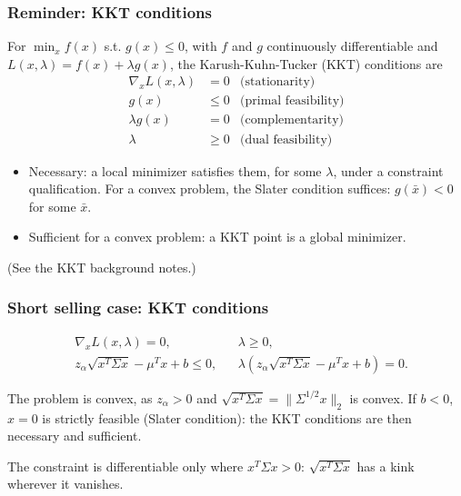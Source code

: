 \documentclass[aspectratio=169]{beamer}
\begin{document}
\begin{frame}
\frametitle{Reminder: KKT conditions}

For $\min_x f(x)$ s.t. $g(x) \leq 0$, with $f$ and $g$ continuously differentiable and $L(x,\lambda) = f(x) + \lambda g(x)$, the Karush-Kuhn-Tucker (KKT) conditions are
\begin{align*}
\nabla_x L(x,\lambda) &= 0 & \text{(stationarity)} \\
g(x) &\leq 0 & \text{(primal feasibility)} \\
\lambda g(x) &= 0 & \text{(complementarity)} \\
\lambda &\geq 0 & \text{(dual feasibility)}
\end{align*}
\begin{itemize}
\item
{\red Necessary}: a local minimizer satisfies them, for some $\lambda$, under a constraint qualification. For a convex problem, the Slater condition suffices: $g(\bar{x}) < 0$ for some $\bar{x}$.
\item
{\red Sufficient} for a convex problem: a KKT point is a global minimizer.
\end{itemize}

\smallskip

{\footnotesize (See the KKT background notes.)}

\end{frame}

\begin{frame}
	\frametitle{Short selling case: KKT conditions}

\begin{align*}
&	\nabla_x L(x, \lambda) = 0, && \lambda \geq 0, \\
&	z_{\alpha} \sqrt{x^T\Sigma x} - \mu^Tx + b \leq 0, && \lambda \left( z_{\alpha} \sqrt{x^T\Sigma x} - \mu^Tx + b \right) = 0.
\end{align*}

\smallskip

The problem is convex, as $z_{\alpha} > 0$ and $\sqrt{x^T\Sigma x} = \|\Sigma^{1/2}x\|_2$ is convex.
If $b < 0$, $x = 0$ is strictly feasible (Slater condition): the KKT conditions are then {\red necessary and sufficient}.

\smallskip

The constraint is differentiable only where $x^T\Sigma x > 0$: $\sqrt{x^T\Sigma x}$ has a kink wherever it vanishes.

\end{frame}
\end{document}
